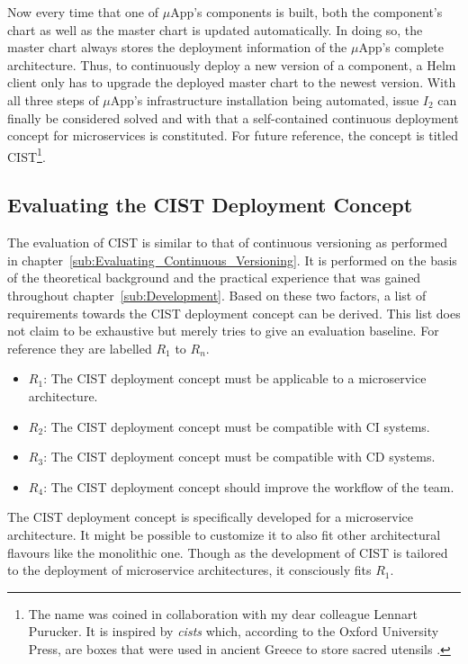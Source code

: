 Now every time that one of $\mu$App's components is built, both the component's
chart as well as the master chart is updated automatically. In doing so, the
master chart always stores the deployment information of the $\mu$App's
complete architecture. Thus, to continuously deploy a new version of a
component, a Helm client only has to upgrade the deployed master chart to the
newest version. With all three steps of $\mu$App's infrastructure installation
being automated, issue $I_2$ can finally be considered solved and with that a
self-contained continuous deployment concept for microservices is constituted.
For future reference, the concept is titled \ac{CIST}\footnote{The name was
coined in collaboration with my dear colleague Lennart Purucker. It is inspired
by \textit{cists} which, according to the Oxford University Press, are boxes
that were used in ancient Greece to store sacred utensils
\autocite{Presscist}.}.

\subsection{Evaluating the \acf{CIST} Deployment Concept}%
\label{sub:Evaluating_the_CIST_Deployment_Concept}

The evaluation of \ac{CIST} is similar to that of continuous versioning as
performed in chapter~\ref{sub:Evaluating_Continuous_Versioning}. It is
performed on the basis of the theoretical background and the practical
experience that was gained throughout chapter~\ref{sub:Development}. Based on
these two factors, a list of requirements towards the \ac{CIST} deployment
concept can be derived. This list does not claim to be exhaustive but merely
tries to give an evaluation baseline. For reference they are labelled $R_1$ to
$R_n$.

\begin{itemize}
  \item \textit{$R_1$}: The \ac{CIST} deployment concept must be applicable to
    a microservice architecture.
  \item \textit{$R_2$}: The \ac{CIST} deployment concept must be compatible
    with \ac{CI} systems.
  \item \textit{$R_3$}: The \ac{CIST} deployment concept must be compatible
    with \ac{CD} systems.
  \item \textit{$R_4$}: The \ac{CIST} deployment concept should improve the
    workflow of the team.
\end{itemize}

The \ac{CIST} deployment concept is specifically developed for a microservice
architecture. It might be possible to customize it to also fit other
architectural flavours like the monolithic one. Though as the development of
\ac{CIST} is tailored to the deployment of microservice architectures, it
consciously fits $R_1$.

